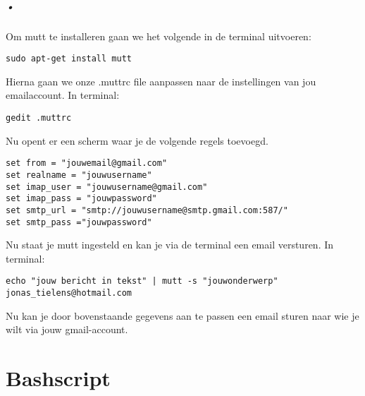 \documentclass[11pt]{report}
\begin{document}
\paragraph{•}
Om mutt te installeren gaan we het volgende in de terminal uitvoeren:
\begin{lstlisting}
sudo apt-get install mutt
\end{lstlisting}
Hierna gaan we onze .muttrc file aanpassen naar de instellingen van jou emailaccount.
In terminal:
\begin{lstlisting}
gedit .muttrc
\end{lstlisting}
Nu opent er een scherm waar je de volgende regels toevoegd.
\begin{lstlisting}
set from = "jouwemail@gmail.com"
set realname = "jouwusername"
set imap_user = "jouwusername@gmail.com"
set imap_pass = "jouwpassword"
set smtp_url = "smtp://jouwusername@smtp.gmail.com:587/"
set smtp_pass ="jouwpassword"
\end{lstlisting}
Nu staat je mutt ingesteld en kan je via de terminal een email versturen.
In terminal:
\begin{lstlisting}
echo "jouw bericht in tekst" | mutt -s "jouwonderwerp" jonas_tielens@hotmail.com
\end{lstlisting}
Nu kan je door bovenstaande gegevens aan te passen een email sturen naar wie je wilt via jouw gmail-account.
\newpage
\renewcommand{\appendixname}{Bijlage}
\chapter{Bashscript}
\newpage
\listoffigures
\listoftables
\printindex
 

\nocite{SiteGit,SiteMutt,SiteMutt2,SiteGit,SiteVoorNadelen,SiteVergelijking,SiteWat,SiteInstall}
\end{document}
